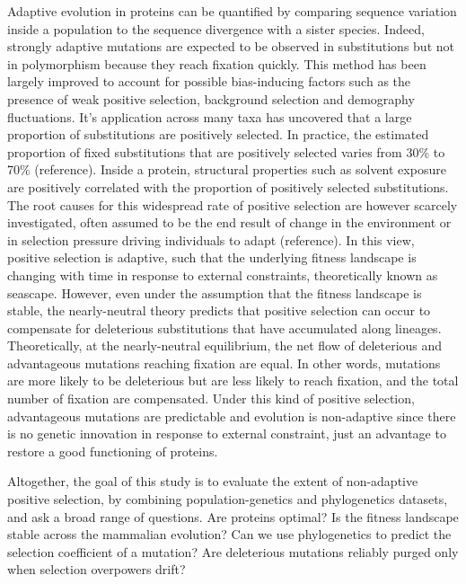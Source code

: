 \documentclass{article}
\begin{document}
    Adaptive evolution in proteins can be quantified by comparing sequence variation inside a population to the sequence divergence with a sister species\cite{mcdonald_adaptative_1991}.
    Indeed, strongly adaptive mutations are expected to be observed in substitutions but not in polymorphism because they reach fixation quickly.
    This method has been largely improved to account for possible bias-inducing factors such as the presence of weak positive selection, background selection and demography fluctuations\cite{eyre-walker_distribution_2006, eyre-walker_estimating_2009, galtier_adaptive_2016, tataru_inference_2017}.
    It's application across many taxa has uncovered that a large proportion of substitutions are positively selected\cite{moutinho_variation_2019}.
    In practice, the estimated proportion of fixed substitutions that are positively selected varies from 30\% to 70\% (reference).
    Inside a protein, structural properties such as solvent exposure are positively correlated with the proportion of positively selected substitutions\cite{moutinho_impact_2019}.
    The root causes for this widespread rate of positive selection are however scarcely investigated, often assumed to be the end result of change in the environment or in selection pressure driving individuals to adapt (reference).
    In this view, positive selection is adaptive, such that the underlying fitness landscape is changing with time in response to external constraints, theoretically known as seascape\cite{mustonen_fitness_2009}.
    However, even under the assumption that the fitness landscape is stable, the nearly-neutral theory\cite{ohta_nearly_1992} predicts that positive selection can occur to compensate for deleterious substitutions that have accumulated along lineages.
    Theoretically, at the nearly-neutral equilibrium, the net flow of deleterious and advantageous mutations reaching fixation are equal\cite{sella_application_2005}.
    In other words, mutations are more likely to be deleterious but are less likely to reach fixation, and the total number of fixation are compensated.
    Under this kind of positive selection, advantageous mutations are predictable and evolution is non-adaptive since there is no genetic innovation in response to external constraint, just an advantage to restore a good functioning of proteins\cite{lassig_predicting_2017}.

    Altogether, the goal of this study is to evaluate the extent of non-adaptive positive selection, by combining population-genetics and phylogenetics datasets, and ask a broad range of questions.
    Are proteins optimal?
    Is the fitness landscape stable across the mammalian evolution?
    Can we use phylogenetics to predict the selection coefficient of a mutation?
    Are deleterious mutations reliably purged only when selection overpowers drift?
\end{document}
